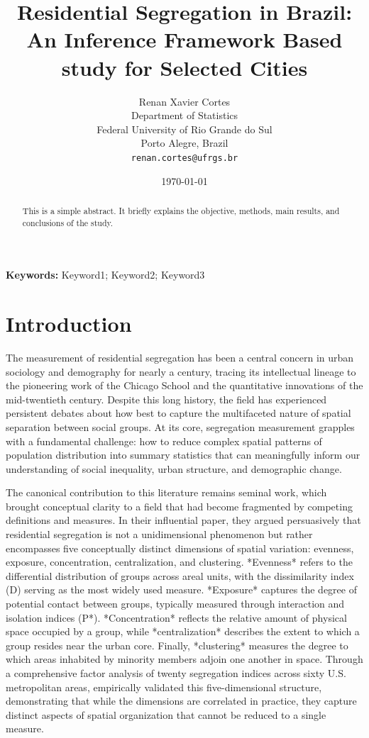 \documentclass[12pt,a4paper]{article}
\title{Residential Segregation in Brazil: An Inference Framework Based study for Selected Cities}
\author{
Renan Xavier Cortes\\
Department of Statistics\\
Federal University of Rio Grande do Sul\\
Porto Alegre, Brazil\\
\texttt{renan.cortes@ufrgs.br}
}
\date{\today}
\begin{document}


\maketitle

\begin{abstract}
This is a simple abstract. It briefly explains the objective,
methods, main results, and conclusions of the study.
\end{abstract}

\noindent\textbf{Keywords:} Keyword1; Keyword2; Keyword3

\section{Introduction}\label{sec:introduction}

The measurement of residential segregation has been a central concern in urban sociology and demography for nearly a century, tracing its intellectual lineage to the pioneering work of the Chicago School and the quantitative innovations of the mid-twentieth century. Despite this long history, the field has experienced persistent debates about how best to capture the multifaceted nature of spatial separation between social groups. At its core, segregation measurement grapples with a fundamental challenge: how to reduce complex spatial patterns of population distribution into summary statistics that can meaningfully inform our understanding of social inequality, urban structure, and demographic change.

The canonical contribution to this literature remains \cite{massey1988dimensions} seminal work, which brought conceptual clarity to a field that had become fragmented by competing definitions and measures. In their influential paper, they argued persuasively that residential segregation is not a unidimensional phenomenon but rather encompasses five conceptually distinct dimensions of spatial variation: evenness, exposure, concentration, centralization, and clustering. *Evenness* refers to the differential distribution of groups across areal units, with the dissimilarity index (D) serving as the most widely used measure. *Exposure* captures the degree of potential contact between groups, typically measured through interaction and isolation indices (P*). *Concentration* reflects the relative amount of physical space occupied by a group, while *centralization* describes the extent to which a group resides near the urban core. Finally, *clustering* measures the degree to which areas inhabited by minority members adjoin one another in space. Through a comprehensive factor analysis of twenty segregation indices across sixty U.S. metropolitan areas, \cite{massey1988dimensions} empirically validated this five-dimensional structure, demonstrating that while the dimensions are correlated in practice, they capture distinct aspects of spatial organization that cannot be reduced to a single measure.
\end{document}
